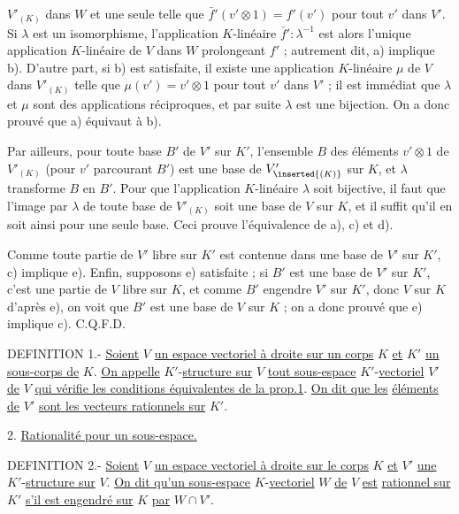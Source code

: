 
$V'_{(K)}$ dans $W$ et une seule telle que $\bar f'(v'\otimes 1)=f'(v')$ pour tout $v'$ dans $V'$.
Si $\lambda$ est un isomorphisme, l'application $K$-linéaire $\bar f'\mathbin{:}\lambda^{-1}$ est alors
l'unique application $K$-linéaire de $V$ dans $W$ prolongeant $f'$ ; autrement dit,
a) implique b). D'autre part, si b) est satisfaite, il existe une application $K$-linéaire $\mu$ de $V$ dans $V'_{(K)}$ telle que $\mu(v')=v'\otimes 1$ pour tout $v'$
dans $V'$ ; il est immédiat que $\lambda$ et $\mu$ sont des applications réciproques, et
par suite $\lambda$ est une bijection. On a donc prouvé que a) équivaut à b).

Par ailleurs, pour toute base $B'$ de $V'$ sur $K'$, l'ensemble $B$ des éléments
$v'\otimes 1$ de $V'_{(K)}$ (pour $v'$ parcourant $B'$) est une base de $V'_{\inserted{(K)}}$ sur $K$, et $\lambda$
transforme $B$ en $B'$. Pour que l'application $K$-linéaire $\lambda$ soit bijective, il
faut que l'image par $\lambda$ de toute base de $V'_{(K)}$ soit une base de $V$ sur $K$, et
il suffit qu'il en soit ainsi pour une seule base. Ceci prouve l'équivalence
de a), c) et d).

Comme toute partie de $V'$ libre sur $K'$ est contenue dans une base de $V'$
sur $K'$, c) implique e). Enfin, supposons e) satisfaite ; si $B'$ est une base
de $V'$ sur $K'$, c'est une partie de $V$ libre sur $K$, et comme $B'$ engendre $V'$
sur $K'$, donc $V$ sur $K$ d'après e), on voit que $B'$ est une base de $V$ sur $K$ ;
on a donc prouvé que e) implique c). C.Q.F.D.

DEFINITION 1.- \uline{Soient} $V$ \uline{un espace vectoriel à droite sur un corps} $K$ \uline{et} $K'$ \uline{un}
\uline{sous-corps de} $K$. \uline{On appelle} $K'$-\uline{structure sur} $V$ \uline{tout sous-espace} $K'$-\uline{vectoriel}
$V'$ \uline{de} $V$ \uline{qui vérifie les conditions équivalentes de la prop.1}. \uline{On dit que les}
\uline{éléments de} $V'$ \uline{sont les vecteurs rationnels sur} $K'$.

2. \uline{Rationalité pour un sous-espace.}

DEFINITION 2.- \uline{Soient} $V$ \uline{un espace vectoriel à droite sur le corps} $K$ \uline{et} $V'$
\uline{une} $K'$-\uline{structure sur} $V$. \uline{On dit qu'un sous-espace} $K$-\uline{vectoriel} $W$ \uline{de} $V$ \uline{est}
\uline{rationnel sur} $K'$ \uline{s'il est engendré sur} $K$ \uline{par} $W\cap V'$.


